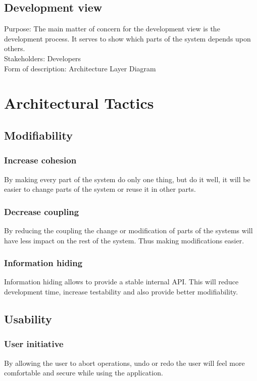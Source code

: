 \documentclass[11pt]{book}
\begin{document}
\subsection{Development view}
Purpose: The main matter of concern for the development view is the development process. It serves to show which parts of the system depends upon others. \\
Stakeholders: Developers\\
Form of description: Architecture Layer Diagram

\section{Architectural Tactics}

\subsection{Modifiability}

\subsubsection{Increase cohesion}
By making every part of the system do only one thing, but do it well, it will be easier to change parts of the system or reuse it in other parts.

\subsubsection{Decrease coupling}
By reducing the coupling the change or modification of parts of the systems will have less impact on the rest of the system. Thus making modifications easier.

\subsubsection{Information hiding}
Information hiding allows to provide a stable internal API. This will reduce development time, increase testability and also provide better modifiability.

\subsection{Usability}

\subsubsection{User initiative}
By allowing the user to abort operations, undo or redo the user will feel more comfortable and secure while using the application.
\end{document}
